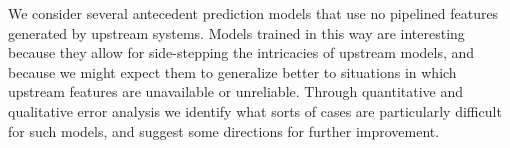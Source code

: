 We consider several antecedent prediction models that use no pipelined features generated by upstream systems. Models trained in this way are interesting because they allow for side-stepping the intricacies of upstream models, and because we might expect them to generalize better to situations in which upstream features are unavailable or unreliable. Through quantitative and qualitative error analysis we identify what sorts of cases are particularly difficult for such models, and suggest some directions for further improvement.
